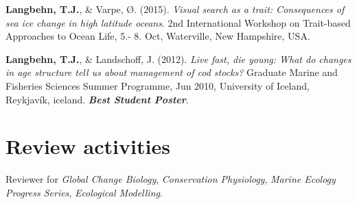 \documentclass[11pt, a4paper]{awesome-cv}
\begin{document}
\leavevmode\hypertarget{ref-Langbehn2}{}%
\textbf{Langbehn, T.J.}, \& Varpe, Ø. (2015). \emph{Visual search as a
trait: Consequences of sea ice change in high latitude oceans}. 2nd
International Workshop on Trait-based Approaches to Ocean Life, 5.- 8.
Oct, Waterville, New Hampshire, USA.

\leavevmode\hypertarget{ref-Langbehn1}{}%
\textbf{Langbehn, T.J.}, \& Landschoff, J. (2012). \emph{Live fast, die
young: What do changes in age structure tell us about management of cod
stocks?} Graduate Marine and Fisheries Sciences Summer Programme, Jun
2010, University of Iceland, Reykjavík, iceland. \emph{\textbf{Best
Student Poster}}.

\endgroup

\hypertarget{review-activities}{%
\section{Review activities}\label{review-activities}}

Reviewer for \emph{Global Change Biology}, \emph{Conservation
Physiology}, \emph{Marine Ecology Progress Series}, \emph{Ecological
Modelling}.
\end{document}
